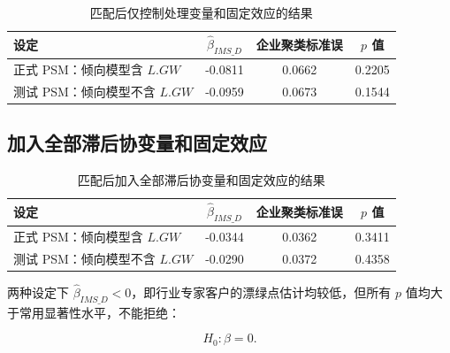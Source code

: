 \documentclass[12pt,a4paper]{article}
\begin{document}
\begin{table}[htbp]
\centering
\caption{匹配后仅控制处理变量和固定效应的结果}
\begin{tabular}{lccc}
\toprule
设定 & $\hat{\beta}_{IMS\_D}$ & 企业聚类标准误 & $p$ 值 \\
\midrule
正式 PSM：倾向模型含 $L.GW$ & -0.0811 & 0.0662 & 0.2205 \\
测试 PSM：倾向模型不含 $L.GW$ & -0.0959 & 0.0673 & 0.1544 \\
\bottomrule
\end{tabular}
\end{table}

\subsection{加入全部滞后协变量和固定效应}

\begin{table}[htbp]
\centering
\caption{匹配后加入全部滞后协变量和固定效应的结果}
\begin{tabular}{lccc}
\toprule
设定 & $\hat{\beta}_{IMS\_D}$ & 企业聚类标准误 & $p$ 值 \\
\midrule
正式 PSM：倾向模型含 $L.GW$ & -0.0344 & 0.0362 & 0.3411 \\
测试 PSM：倾向模型不含 $L.GW$ & -0.0290 & 0.0372 & 0.4358 \\
\bottomrule
\end{tabular}
\end{table}

两种设定下 $\hat{\beta}_{IMS\_D}<0$，即行业专家客户的漂绿点估计均较低，但所有 $p$ 值均大于常用显著性水平，不能拒绝：

\begin{equation}
    H_0:\beta=0.
\end{equation}
\end{document}

